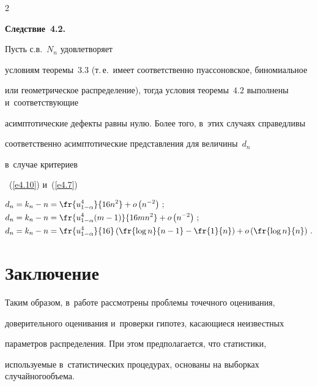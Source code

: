 \begin{multicols}{2}
\noindent


\textbf{Следствие~4.2.}\ {Пусть с.в.~$N_n$ удовлетворяет 


условиям теоремы~$3.3$ (т.\,е.\ имеет соответственно пуассоновское, биномиальное 


или гео\-мет\-ри\-че\-ское распреде\-ле\-ние), тогда условия теоремы~$4.2$ выполнены и~соответствующие 


асимптотические дефекты равны нулю. Более того, в~этих случаях справедливы 


соответственно асимптотические представления для величины~$d_n$ 


в~случае критериев}~(\ref{e4.10}) {и}~(\ref{e4.7})


\begin{align*}


d_n& = k_n - n = \fr{u^4_{1-\alpha}}{16n^2} + o\left(n^{-2}\right)\,;


\\


d_n &= k_n - n = \fr{u^4_{1-\alpha}(m-1)}{16mn^2} +


o \left(n^{-2}\right)\,;


\\


d_n &= k_n - n = \fr{u^4_{1-\alpha}}{16}\left(\fr{\log n}{n - 1} - 


\fr{1}{n}\right) +  o\left(\fr{\log n}{n}\right)\,.


\end{align*}








\section{Заключение}





Таким образом, в~работе рассмотрены проблемы точечного оценивания, 


доверительного оценивания и~проверки гипотез, касающиеся неизвестных\linebreak 


параметров распределения. При этом предполага\-ется, что статистики, 


используемые в~статистиче\-ских процедурах, основаны на выборках случайного\linebreak объема. 






\end{multicols}
